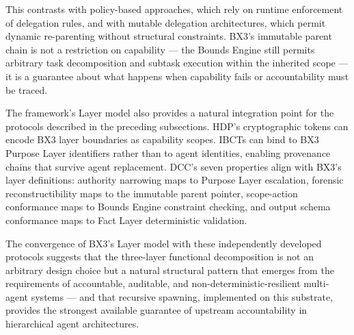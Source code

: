 This contrasts with policy-based approaches, which rely on runtime enforcement of delegation rules, and with mutable delegation architectures, which permit dynamic re-parenting without structural constraints. BX3's immutable parent chain is not a restriction on capability --- the Bounds Engine still permits arbitrary task decomposition and subtask execution within the inherited scope --- it is a guarantee about what happens when capability fails or accountability must be traced.

The framework's Layer model also provides a natural integration point for the protocols described in the preceding subsections. HDP's cryptographic tokens can encode BX3 layer boundaries as capability scopes. IBCTs can bind to BX3 Purpose Layer identifiers rather than to agent identities, enabling provenance chains that survive agent replacement. DCC's seven properties align with BX3's layer definitions: authority narrowing maps to Purpose Layer escalation, forensic reconstructibility maps to the immutable parent pointer, scope-action conformance maps to Bounds Engine constraint checking, and output schema conformance maps to Fact Layer deterministic validation.

The convergence of BX3's Layer model with these independently developed protocols suggests that the three-layer functional decomposition is not an arbitrary design choice but a natural structural pattern that emerges from the requirements of accountable, auditable, and non-deterministic-resilient multi-agent systems --- and that recursive spawning, implemented on this substrate, provides the strongest available guarantee of upstream accountability in hierarchical agent architectures.
